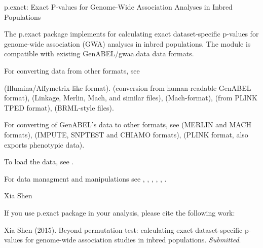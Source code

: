 \documentclass[a4paper]{book}
\begin{document}
%
\begin{Description}\relax
p.exact: Exact P-values for Genome-Wide Association Analyses in Inbred Populations
\end{Description}
%
\begin{Details}\relax
The p.exact package implements for calculating exact dataset-specific p-values for
genome-wide association (GWA) analyses in inbred populations. The module is
compatible with existing GenABEL/gwaa.data data formats.

For converting data from other formats, see

 (Illumina/Affymetrix-like format).
 (conversion from human-readable GenABEL format),
 (Linkage, Merlin, Mach, and similar files),
 (Mach-format),
 (from PLINK TPED format),
 (BRML-style files).

For converting of GenABEL's data to other formats, see
 (MERLIN and MACH formats),
 (IMPUTE, SNPTEST and CHIAMO formats),
 (PLINK format, also exports phenotypic data).

To load the data, see .

For data managment and manipulations see
,
,
,
,
,
.
\end{Details}
%
\begin{Author}\relax
Xia Shen
\end{Author}
%
\begin{References}\relax
If you use p.exact package in your analysis, please cite the following work:

Xia Shen (2015).
Beyond permutation test: calculating exact dataset-specific p-values for
genome-wide association studies in inbred populations. \emph{Submitted}.
\end{References}
\end{document}
